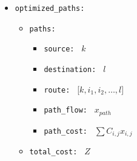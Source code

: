 \documentclass{article}
\begin{document}
\begin{itemize}
    \item \texttt{optimized\_paths:}
    \begin{itemize}
        \item \texttt{paths:}
        \begin{itemize}
            \item \texttt{source: } \( k \)
            \item \texttt{destination: } \( l \)
            \item \texttt{route: } [\( k, i_1, i_2, \ldots, l \)]
            \item \texttt{path\_flow: } \( x_{path} \)
            \item \texttt{path\_cost: } \( \sum C_{i,j} x_{i,j} \)
        \end{itemize}
        \item \texttt{total\_cost: } \( Z \)
    \end{itemize}
\end{itemize}
\end{document}
